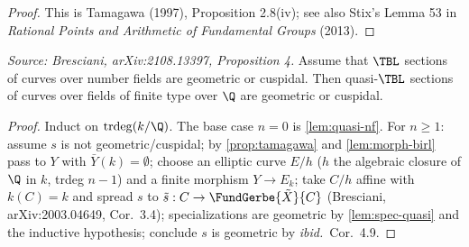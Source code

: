 \begin{proof}
  This is Tamagawa (1997), Proposition 2.8(iv); see also Stix's Lemma 53 in
  \textit{Rational Points and Arithmetic of Fundamental Groups} (2013).
\end{proof}

\begin{proposition}[NFFG]
  \label{prop:nffg}
  \textit{Source: Bresciani, arXiv:2108.13397, Proposition 4.}
  Assume that \(\TBL\) sections of curves over number fields are geometric or cuspidal.
  Then quasi-\(\TBL\) sections of curves over fields of finite type over \(\Q\) are
  geometric or cuspidal.
\end{proposition}

\begin{proof}
  Induct on \(\mathrm{trdeg}(k/\Q)\). The base case \(n = 0\) is \cref{lem:quasi-nf}.
  For \(n \geq 1\): assume \(s\) is not geometric/cuspidal; by \cref{prop:tamagawa}
  and \cref{lem:morph-birl} pass to \(Y\) with \(\bar{Y}(k) = \emptyset\); choose an
  elliptic curve \(E/h\) (\(h\) the algebraic closure of \(\Q\) in \(k\), trdeg
  \(n-1\)) and a finite morphism \(Y \to E_k\); take \(C/h\) affine with \(k(C) = k\)
  and spread \(s\) to \(\tilde{s} : C \to \FundGerbe{\tilde{X}}{C}\) (Bresciani,
  arXiv:2003.04649, Cor.\ 3.4); specializations are geometric by \cref{lem:spec-quasi}
  and the inductive hypothesis; conclude \(s\) is geometric by \textit{ibid.}\ Cor.\ 4.9.
\end{proof}

